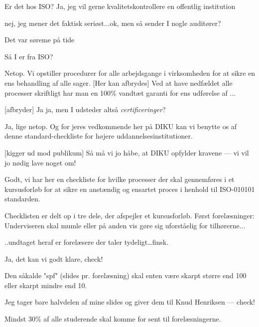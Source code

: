 \documentclass[danish]{article}
\begin{document}
\begin{sketch}
 Er det hos ISO? Ja, jeg vil gerne kvalitetskontrollere en
offentlig institution


 nej, jeg mener det faktisk seriøst...ok, men så sender I
nogle auditører?


 Det var søreme på tide 

 Så I er fra ISO?

 Netop. Vi opstiller procedurer for alle arbejdsgange i
virksomheden for at sikre en ens behandling af alle sager. [Her kan afbrydes] Ved at have
nedfældet alle processer skriftligt har man en 100\% vandtæt garanti
for ens udførelse af ...

 [afbryder] Ja ja, men I udsteder altså
\emph{certificeringer}?


 Ja, lige netop. Og for jeres vedkommende her på DIKU kan vi
benytte os af denne standard-checkliste for højere uddannelsesinstitutioner.

 [kigger ud mod publikum] Så må vi jo håbe, at DIKU
opfylder kravene --- vi vil jo nødig lave noget om!

 Godt, vi har her en checkliste for hvilke processer der
skal gennemføres i et kursusforløb for at sikre en anstændig og
ensartet proces i henhold til ISO-010101 standarden.


 Checklisten er delt op i tre dele, der afspejler et
kursusforløb. Først forelæsninger: Underviseren skal mumle eller på
anden vis gøre sig uforståelig for tilhørerne...


 ..undtaget heraf er forelæsere der taler tydeligt\ldots finsk.

 Ja, det kan vi godt klare, check!

 Den såkalde "spf" (slides pr. forelæsning) skal enten være
skarpt større end 100 eller skarpt mindre end 10.

 Jeg tager bare halvdelen af mine slides og giver dem til
Knud Henriksen --- check!

 Mindst 30\% af alle studerende skal komme for sent til
forelæsningerne.


\end{sketch}
\end{document}
